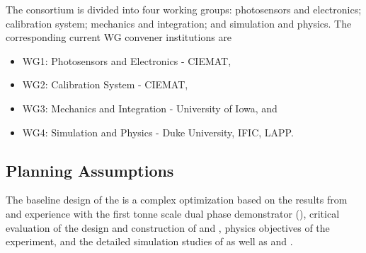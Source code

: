 The \dual {} consortium is divided into four working groups: photosensors and electronics; calibration system; mechanics and integration; and simulation and physics. The corresponding current WG convener institutions are
\begin{itemize}
\item WG1: Photosensors and Electronics -  CIEMAT, %
\item WG2: Calibration System -  CIEMAT, %
\item WG3: Mechanics and Integration - University of Iowa, and %
\item WG4: Simulation and Physics - %
Duke University, %
IFIC, %
LAPP.
\end{itemize}





\subsection{Planning Assumptions}
\label{sec:fddp-pd-12.2}

The baseline design of the \dual {} is a complex optimization based on the results from and experience with the first tonne scale dual phase   demonstrator (), critical evaluation of the design and construction of  and , physics objectives of the \dune experiment, and the detailed simulation studies of \dune {} as well as  and .


